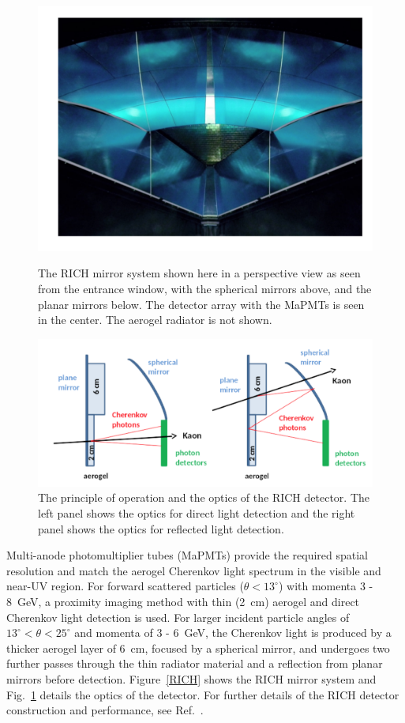 \documentclass[final,3p,twocolumn]{elsarticle}
\begin{document}
\begin{figure}[t!]
\centerline{\includegraphics[width=1.0\columnwidth]{rich-mirrors.png}}
\caption{The RICH mirror system shown here in a perspective view as seen from the entrance window, with the
  spherical mirrors above, and the planar mirrors below. The detector array with the MaPMTs is seen in the center.
  The aerogel radiator is not shown.}
\label{RICH}
\includegraphics[width=1.0\columnwidth]{rich.png}
\caption{The principle of operation and the optics of the RICH detector. The left panel shows the optics for direct
  light detection and the right panel shows the optics for reflected light detection.}
\label{RICH-optics}
\end{figure}

Multi-anode photomultiplier tubes (MaPMTs) provide the required spatial resolution and match the aerogel
Cherenkov light spectrum in the visible and near-UV region. For forward scattered particles ($\theta < 13^\circ$)
with momenta 3 - 8~GeV, a proximity imaging method with thin (2~cm) aerogel and direct Cherenkov light detection
is used. For larger incident particle angles of $13^\circ < \theta < 25^\circ$ and momenta of 3 - 6~GeV, the Cherenkov
light is produced by a thicker aerogel layer of 6~cm, focused by a spherical mirror, and undergoes two further passes
through the thin radiator material and a reflection from planar mirrors before detection. Figure~\ref{RICH} shows
the RICH mirror system and Fig.~\ref{RICH-optics} details the optics of the detector. For further details of the
RICH detector construction and performance, see Ref.~\cite{RICH}.
\end{document}
